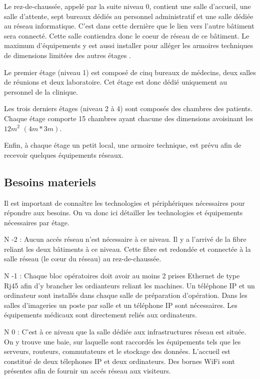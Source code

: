 %

Le rez-de-chaussée, appelé par la suite niveau 0, contient une salle d'accueil, une salle d'attente, sept bureaux dédiés au personnel administratif et une salle dédiée au réseau informatique.
C'est dans cette dernière que le lien vers l'autre bâtiment sera connecté.
Cette salle contiendra donc le coeur de réseau de ce bâtiment.
Le maximum d'équipements y est aussi installer pour alléger les armoires techniques de dimensions limitées des autres étages .

%

Le premier étage (niveau 1) est composé de cinq bureaux de médecins, deux salles de réunions et deux laboratoire.
Cet étage est donc dédié uniquement au personnel de la clinique.

%

Les trois derniers étages (niveau 2 à 4) sont composés des chambres des patients.
Chaque étage comporte 15 chambres ayant chacune des dimensions avoisinant les $12 m^2$ $(4m*3m)$.

%

Enfin, à chaque étage un petit local, une armoire technique, est prévu afin de recevoir quelques équipements réseaux.


%
%
\subsection{Besoins materiels}

Il est important de connaître les technologies et périphériques nécessaires pour répondre aux besoins.
On va donc ici détailler les technologies et équipements nécessaires par étage.

%

N -2 :
Aucun accés réseau n'est nécessaire à ce niveau.
Il y a l'arrivé de la fibre reliant les deux bâtiments à ce niveau.
Cette fibre est redondée et connectée à la salle réseau (le cœur du réseau) au rez-de-chaussée.

%

N -1 :
Chaque bloc opératoires doit avoir au moins 2 prises Ethernet de type Rj45 afin d'y brancher les ordianteurs reliant les machines.
Un téléphone IP et un ordinateur sont installés dans chaque salle de préparation d'opération.
Dans les salles d’imageries un poste par salle et un téléphone IP sont nécessaires.
Les équipements médicaux sont directement reliés aux ordinateurs.

%

N 0 :
C'est à ce niveau que la salle dédiée aux infrastructures réseau est située.
On y trouve une baie, sur laquelle sont raccordés les équipements tels que les serveurs, routeurs, commutateurs et le stockage des données.
L'accueil est constitué de deux télephones IP et deux ordinateurs.
Des bornes WiFi sont présentes afin de fournir un accés réseau aux visiteurs.

